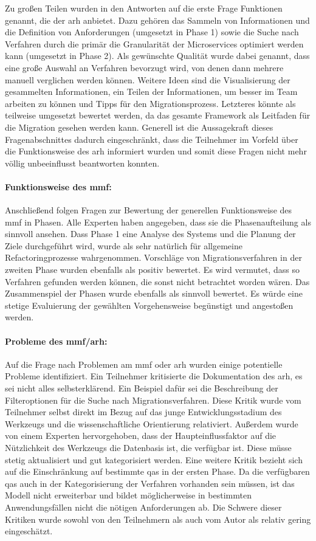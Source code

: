 Zu großen Teilen wurden in den Antworten auf die erste Frage Funktionen genannt, die der \gls{arh} anbietet.
Dazu gehören das Sammeln von Informationen und die Definition von Anforderungen (umgesetzt in Phase 1)  sowie die Suche nach Verfahren durch die primär die Granularität der Microservices optimiert werden kann (umgesetzt in Phase 2).
Als gewünschte Qualität wurde dabei genannt, dass eine große Auswahl an Verfahren bevorzugt wird, von denen dann mehrere manuell verglichen werden können.
Weitere Ideen sind die Visualisierung der gesammelten Informationen, ein Teilen der Informationen, um besser im Team arbeiten zu können und Tipps für den Migrationsprozess.
Letzteres könnte als teilweise umgesetzt bewertet werden, da das gesamte Framework als Leitfaden für die Migration gesehen werden kann.
Generell ist die Aussagekraft dieses Fragenabschnittes dadurch eingeschränkt, dass die Teilnehmer im Vorfeld über die Funktionsweise des \gls{arh} informiert wurden und somit diese Fragen nicht mehr völlig unbeeinflusst beantworten konnten.

\paragraph{Funktionsweise des \gls{mmf}:} Anschließend folgen Fragen zur Bewertung der generellen Funk\-ti\-ons\-wei\-se des \gls{mmf} in Phasen.
Alle Experten haben angegeben, dass sie die Phasenaufteilung als sinnvoll ansehen.
Dass Phase 1 eine Analyse des Systems und die Planung der Ziele durchgeführt wird, wurde als sehr natürlich für allgemeine Refactoringprozesse wahrgenommen.
Vorschläge von Migrationsverfahren in der zweiten Phase wurden ebenfalls als positiv bewertet.
Es wird vermutet, dass so Verfahren gefunden werden können, die sonst nicht betrachtet worden wären.
Das Zusammenspiel der Phasen wurde ebenfalls als sinnvoll bewertet.
Es würde eine stetige Evaluierung der gewählten Vorgehensweise begünstigt und angestoßen werden.

\paragraph{Probleme des \gls{mmf}/\gls{arh}:} Auf die Frage nach Problemen am \gls{mmf} oder \gls{arh} wurden einige potentielle Probleme identifiziert.
Ein Teilnehmer kritisierte die Dokumentation des \gls{arh}, es sei nicht alles selbsterklärend.
Ein Beispiel dafür sei die Beschreibung der Filteroptionen für die Suche nach Migrationsverfahren.
Diese Kritik wurde vom Teilnehmer selbst direkt im Bezug auf das junge Entwicklungsstadium des Werkzeugs und die wissenschaftliche Orientierung relativiert.
Außerdem wurde von einem Experten hervorgehoben, dass der Haupteinflussfaktor auf die Nützlichkeit des Werkzeugs die Datenbasis ist, die verfügbar ist.
Diese müsse stetig aktualisiert und gut kategorisiert werden.
Eine weitere Kritik bezieht sich auf die Einschränkung auf bestimmte \glspl{qa} in der ersten Phase.
Da die verfügbaren \glspl{qa} auch in der Kategorisierung der Verfahren vorhanden sein müssen, ist das Modell nicht erweiterbar und bildet möglicherweise in bestimmten Anwendungsfällen nicht die nötigen Anforderungen ab.
Die Schwere dieser Kritiken wurde sowohl von den Teilnehmern als auch vom Autor als relativ gering eingeschätzt.

